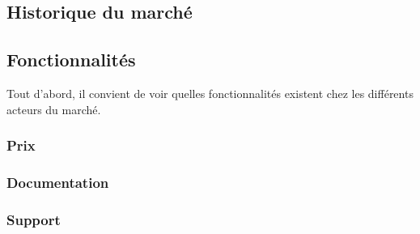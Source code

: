 \subsection {Historique du marché}

\subsection{Fonctionnalités}
  Tout d'abord, il convient de voir quelles fonctionnalités existent chez les différents
  acteurs du marché.
  \subsubsection{Prix}
  \subsubsection{Documentation}
  \subsubsection{Support}
